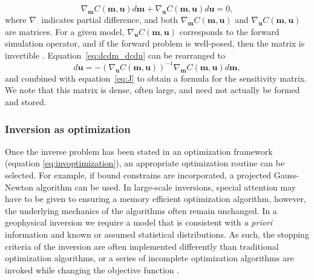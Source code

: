 \documentclass[preprint,review,3p,times,onecolumn,authoryear]{elsarticle}
\newcommand{\m}{\mathbf{m}}
\renewcommand {\u}  { {\mathbf u} }
\begin{document}
{%
\begin{equation}
\label{eq:dcdm_dcdu}
    \nabla_\m C(\m,\u) d \m  +
    \nabla_\u C(\m,\u) d \u
    = 0,
\end{equation}
}
where $\nabla_{\cdot}$ indicates partial difference, and both $\nabla_\m C(\m,\u)$ and $\nabla_\u C(\m,\u)$ are matrices.
For a given model, $\nabla_\u C(\m,\u)$ corresponds to the forward simulation operator, and if the forward problem is well-posed, then the matrix is invertible \citep{haber2015computational}.
Equation~\ref{eq:dcdm_dcdu} can be rearranged to
{%
\begin{equation}
\label{eq:dcdm_dcdu_rearranged}
d \u =
    - \left(\nabla_\u C(\m,\u)\right)^{-1}
    \nabla_\m C(\m,\u) d \m,
\end{equation}
}
and combined with equation~\ref{eq:J} to obtain a formula for the sensitivity matrix.
We note that this matrix is dense, often large, and need not actually be formed and stored.



\subsubsection*{Inversion as optimization}


Once the inverse problem has been stated in an optimization framework (equation \ref{eq:invoptimization}),
an appropriate optimization routine can be selected.
For example, if bound constrains are incorporated, a projected Gauss-Newton algorithm can be used.
In large-scale inversions, special attention may have to be given to ensuring a memory efficient
optimization algorithm, however, the underlying mechanics of the algorithms often remain unchanged. %
In a geophysical inversion we require a model that is consistent with \emph{a priori} information and
known or assumed statistical distributions. %
As such, the stopping criteria of the inversion are often implemented differently than traditional optimization algorithms,
or a series of incomplete optimization algorithms are invoked while changing the objective function \citep{DougTutorial,haber2015computational,haber2000optimization}.
\end{document}
